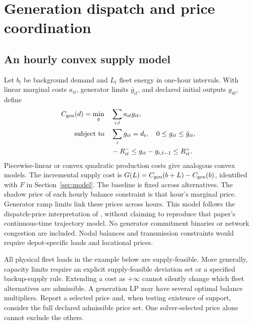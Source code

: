 \section{Generation dispatch and price coordination}\label{sec:generation}

\subsection{An hourly convex supply model}
Let $b_t$ be background demand and $L_t$ fleet energy in one-hour intervals.
With linear marginal costs $a_{it}$, generator limits $\bar g_{it}$, and
declared initial outputs $g_{i0}$, define
\begin{equation}\label{eq:dispatch-value}
\begin{aligned}
 C_{\rm gen}(d)=\min_g\quad &\sum_{i,t}a_{it}g_{it},\\
 \text{subject to}\quad &\sum_i g_{it}=d_t,\quad
 0\le g_{it}\le\bar g_{it},\\
 &-R^-_{it}\le g_{it}-g_{i,t-1}\le R^+_{it}.
\end{aligned}
\end{equation}
Piecewise-linear or convex quadratic production costs give analogous convex
models. The incremental supply cost is $G(L)=C_{\rm gen}(b+L)-C_{\rm gen}(b)$, identified with
$F$ in Section~\ref{sec:model}. The baseline is fixed across alternatives.
The shadow price of each hourly balance constraint is that hour's marginal
price. Generator ramp limits link these prices across hours. This model follows the dispatch-price interpretation of
\citet{scaglione2016marginal}, without claiming to reproduce that paper's
continuous-time trajectory model. No generator commitment binaries or
network congestion are included. Nodal balances and transmission constraints
would require depot-specific loads and locational prices.

All physical fleet loads in the example below are supply-feasible. More
generally, capacity limits require an explicit supply-feasible deviation set
or a specified backup-supply rule. Extending a cost as $+\infty$ cannot
silently change which fleet alternatives are admissible. A generation LP
may have several optimal balance multipliers. Report a selected price and,
when testing existence of support, consider the full declared admissible
price set. One solver-selected price alone cannot exclude the others.

